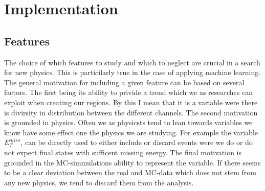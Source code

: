 \chapter{Implementation}\label{chap:Implementation}
\section{Features}
The choice of which features to study and which to neglect are crucial in a search for new physics. This is particilarly true 
in the case of applying machine learning. The general motivation for including a given feature can be based on several factors. 
The first being its ability to privide a trend which we as researches can exploit when creating our regions. By this I mean
that it is a variable were there is divirsity in distribution between the different channels. The second motivation is grounded in 
physics. Often we as physicsts tend to lean towards variables we know have some effect one the physics we are studying. For 
example the variable $E_T^{miss}$, can be directly used to either include or discard events were we do or do not expect final states
with sufficent missing energy. The final motivation is grounded in the MC-simmulations ability to represent the variable.
If there seems to be a clear deviation between the real and MC-data which does not stem from any new physics, we tend to discard
them from the analysis.

